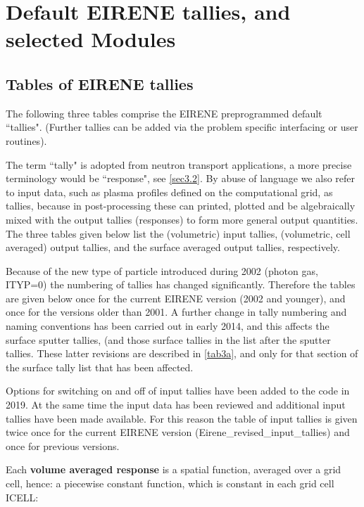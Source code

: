 \chapter{Default EIRENE tallies, and selected Modules}\label{sec.tables-modules}

\section{Tables of EIRENE tallies}\label{sec.tables}

The following three tables comprise the EIRENE preprogrammed default
``tallies".
(Further tallies can be added via the problem specific interfacing or user
routines).

The term ``tally" is adopted from neutron transport applications, a more
precise terminology would be ``response", see \cref{sec3.2}.
By abuse of language we also refer to input data, such as plasma profiles
defined on the computational grid, as tallies, because in post-processing these
can printed, plotted and be algebraically mixed with the output tallies
(responses) to form more general output quantities.
The three tables given below list the (volumetric) input tallies, (volumetric,
cell averaged) output tallies, and the surface averaged output tallies,
respectively.

Because of the new type of particle introduced during 2002 (photon gas, ITYP=0)
the numbering of tallies has changed significantly.
Therefore the tables are given below once for the current EIRENE version (2002
and younger), and once for the versions older than 2001.
A further change in tally numbering and naming conventions has been carried out
in early 2014, and this affects the surface sputter tallies, (and those surface
tallies in the list after the sputter tallies.
These latter revisions are described in \cref{tab3a}, and only for that section
of the surface tally list that has been affected.

Options for switching on and off of input tallies have been added to the code
in 2019.
At the same time the input data has been reviewed and additional input tallies
have been made available.
For this reason the table of input tallies is given twice once for the current
EIRENE version (Eirene\_revised\_input\_tallies) and once for previous versions.

\vspace{1em}

Each \textbf{volume averaged response} is a spatial function, averaged over a
grid cell, hence: a piecewise constant function, which is constant in each grid
cell ICELL:

